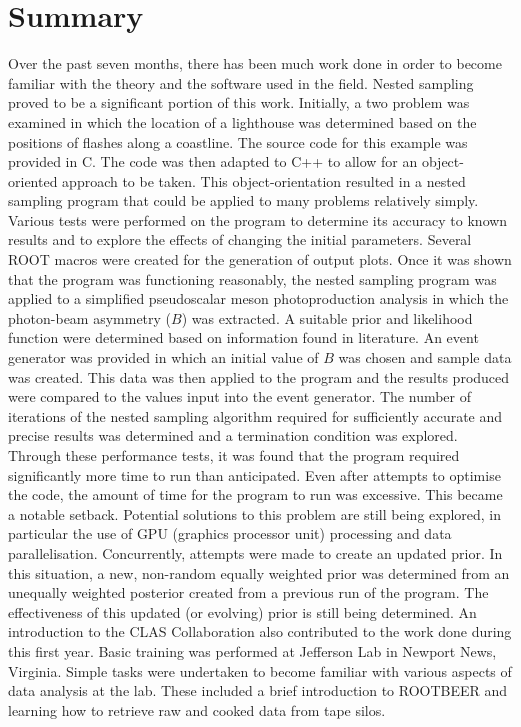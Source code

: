 \documentclass[a4paper,12pt]{article}
\begin{document}
\section{Summary}
Over the past seven months, there has been much work done in order to become familiar with the theory and the software used in the field. Nested sampling proved to be a significant portion of this work.  Initially, a two problem was examined in which the location of a lighthouse was determined based on the positions of flashes along a coastline.  The source code for this example was provided in C.  The code was then adapted to C++ to allow for an object-oriented approach to be taken.  This object-orientation resulted in a nested sampling program that could be applied to many problems relatively simply.  Various tests were performed on the program to determine its accuracy to known results and to explore the effects of changing the initial parameters. Several ROOT macros were created for the generation of output plots.  Once it was shown that the program was functioning reasonably, the nested sampling program was applied to a simplified pseudoscalar meson photoproduction analysis in which the photon-beam asymmetry ($B$) was extracted.  A suitable prior and likelihood function were determined based on information found in literature.  An event generator was provided in which an initial value of $B$ was chosen and sample data was created.  This data was then applied to the program and the results produced were compared to the values input into the event generator.  The number of iterations of the nested sampling algorithm required for sufficiently accurate and precise results was determined and a termination condition was explored.  Through these performance tests, it was found that the program required significantly more time to run than anticipated.  Even after attempts to optimise the code, the amount of time for the program to run was excessive.  This became a notable setback.  Potential solutions to this problem are still being explored, in particular the use of GPU (graphics processor unit) processing and data parallelisation.  Concurrently, attempts were made to create an updated prior.  In this situation, a new, non-random equally weighted prior was determined from an unequally weighted posterior created from a previous run of the program.  The effectiveness of this updated (or evolving) prior is still being determined.
\newline
An introduction to the CLAS Collaboration also contributed to the work done during this first year.  Basic training was performed at Jefferson Lab in Newport News, Virginia.  Simple tasks were undertaken to become familiar with various aspects of data analysis at the lab.  These included a brief introduction to ROOTBEER and learning how to retrieve raw and cooked data from tape silos.  
\end{document}
